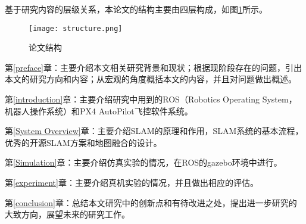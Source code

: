 基于研究内容的层级关系，本论文的结构主要由四层构成，如图\ref{fig1}所示。
\vspace{10pt}
\begin{figure}[!ht]
\centering
\texttt{[image: structure.png]}
\caption{论文结构 }
\label{fig1}
\end{figure}


第\ref{preface}章：主要介绍本文相关研究背景和现状；根据现阶段存在的问题，引出本文的研究方向和内容；从宏观的角度概括本文的内容，并且对问题做出概述。

第\ref{introduction}章：主要介绍研究中用到的ROS（Robotics Operating System，机器人操作系统）和PX4 AutoPilot飞控软件系统。

第\ref{System Overview}章：主要介绍SLAM的原理和作用，SLAM系统的基本流程，优秀的开源SLAM方案和地图融合的设计。

第\ref{Simulation}章：主要介绍仿真实验的情况，在ROS的gazebo环境中进行。

第\ref{experiment}章：主要介绍真机实验的情况，并且做出相应的评估。

第\ref{conclusion}章：总结本文研究中的创新点和有待改进之处，提出进一步研究的大致方向，展望未来的研究工作。

